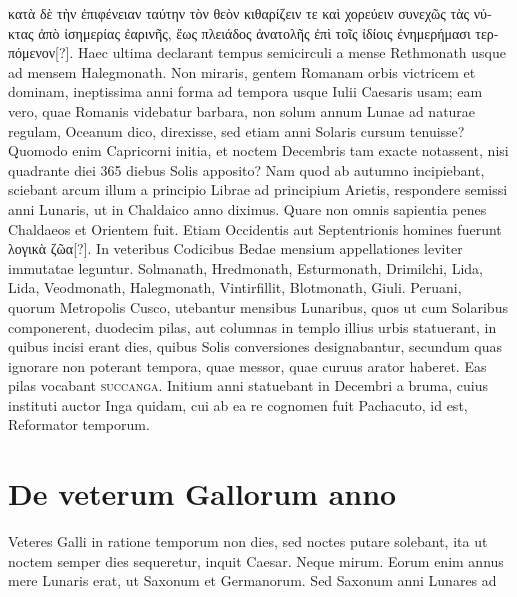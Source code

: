 \textgreek{κατὰ δὲ τὴν ἐπιφένειαν
ταύτην τὸν θεὸν κιθαρίζειν τε καὶ χορεύειν συνεχῶς τὰς νύκτας ἀπὸ ἰσημερίας ἐαρινῆς,
ἕως πλειάδος ἀνατολῆς ἐπὶ τοῖς ἰδίοις ἐνημερήμασι τερπόμενον[?]}.
%
Haec
ultima declarant tempus semicirculi a mense Rethmonath usque ad
mensem Halegmonath.
Non miraris, gentem Romanam orbis victricem
et dominam, ineptissima anni forma ad tempora usque Iulii Caesaris
usam; eam vero, quae Romanis videbatur barbara, non solum annum
Lunae ad naturae regulam, Oceanum dico, direxisse, sed etiam anni
Solaris cursum tenuisse?
Quomodo enim Capricorni initia, et  noctem
Decembris tam exacte notassent, nisi quadrante diei 365 diebus
Solis apposito?
Nam quod ab autumno incipiebant, sciebant arcum
illum a principio Librae ad principium Arietis, respondere semissi anni
Lunaris, ut in Chaldaico anno diximus.
Quare non omnis sapientia
penes Chaldaeos et Orientem fuit.
Etiam Occidentis aut Septentrionis
homines fuerunt \textgreek{λογικὰ ζῶα[?]}.
In veteribus Codicibus Bedae
mensium appellationes leviter immutatae leguntur.
Solmanath, Hredmonath,
Esturmonath, Drimilchi, Lida, Lida, Veodmonath,
Halegmonath, Vintirfillit, Blotmonath, Giuli.
Peruani, quorum
Metropolis Cusco, utebantur mensibus Lunaribus, quos ut cum
Solaribus componerent, duodecim pilas, aut columnas in templo illius
urbis statuerant, in quibus incisi erant dies, quibus Solis conversiones
designabantur, secundum quas ignorare non poterant tempora,
quae messor, quae curuus arator haberet.
Eas pilas vocabant \textsc{succanga}.
Initium anni statuebant in Decembri a bruma, cuius instituti
auctor Inga quidam, cui ab ea re cognomen fuit Pachacuto, id
est, Reformator temporum.
%
\begin{table}[tb]
  
\end{table}
%
%
\section{De veterum Gallorum anno}
Veteres Galli in ratione temporum non dies, sed noctes putare
solebant, ita ut noctem semper dies sequeretur, inquit
Caesar.
Neque mirum.
Eorum enim annus mere Lunaris
erat, ut Saxonum et Germanorum.
Sed Saxonum anni Lunares ad
